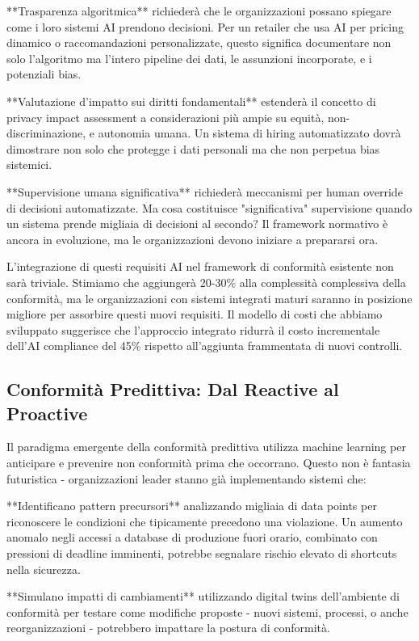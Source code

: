 **Trasparenza algoritmica** richiederà che le organizzazioni possano spiegare come i loro sistemi AI prendono decisioni. Per un retailer che usa AI per pricing dinamico o raccomandazioni personalizzate, questo significa documentare non solo l'algoritmo ma l'intero pipeline dei dati, le assunzioni incorporate, e i potenziali bias.

**Valutazione d'impatto sui diritti fondamentali** estenderà il concetto di privacy impact assessment a considerazioni più ampie su equità, non-discriminazione, e autonomia umana. Un sistema di hiring automatizzato dovrà dimostrare non solo che protegge i dati personali ma che non perpetua bias sistemici.

**Supervisione umana significativa** richiederà meccanismi per human override di decisioni automatizzate. Ma cosa costituisce "significativa" supervisione quando un sistema prende migliaia di decisioni al secondo? Il framework normativo è ancora in evoluzione, ma le organizzazioni devono iniziare a prepararsi ora.

L'integrazione di questi requisiti AI nel framework di conformità esistente non sarà triviale. Stimiamo che aggiungerà 20-30\% alla complessità complessiva della conformità, ma le organizzazioni con sistemi integrati maturi saranno in posizione migliore per assorbire questi nuovi requisiti. Il modello di costi che abbiamo sviluppato suggerisce che l'approccio integrato ridurrà il costo incrementale dell'AI compliance del 45\% rispetto all'aggiunta frammentata di nuovi controlli.

\subsection{Conformità Predittiva: Dal Reactive al Proactive}

Il paradigma emergente della conformità predittiva utilizza machine learning per anticipare e prevenire non conformità prima che occorrano. Questo non è fantasia futuristica - organizzazioni leader stanno già implementando sistemi che:

**Identificano pattern precursori** analizzando migliaia di data points per riconoscere le condizioni che tipicamente precedono una violazione. Un aumento anomalo negli accessi a database di produzione fuori orario, combinato con pressioni di deadline imminenti, potrebbe segnalare rischio elevato di shortcuts nella sicurezza.

**Simulano impatti di cambiamenti** utilizzando digital twins dell'ambiente di conformità per testare come modifiche proposte - nuovi sistemi, processi, o anche reorganizzazioni - potrebbero impattare la postura di conformità.


